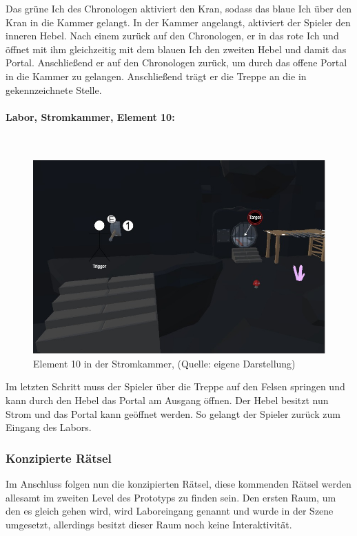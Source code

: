 Das grüne Ich des Chronologen aktiviert den Kran, sodass das blaue Ich über den Kran in die Kammer gelangt. In der Kammer angelangt, aktiviert der Spieler den inneren Hebel. Nach einem  zurück auf den Chronologen,  er in das rote Ich und öffnet mit ihm gleichzeitig mit dem blauen Ich den zweiten Hebel und damit das Portal. Anschließend  er auf den Chronologen zurück, um durch das offene Portal in die Kammer zu gelangen. Anschließend trägt er die Treppe an die in  gekennzeichnete Stelle.
\newpage
\paragraph{Labor, Stromkammer, Element 10:}\label{p:lse10}
~
\begin{figure}[ht]
\centering
\includegraphics[width=1\linewidth]{content/pictures/Raetsel-L02_R01_R09.jpg}
\caption{Element 10 in der Stromkammer, (Quelle: eigene Darstellung)}
\label{fig:L02_R01_R09}
\end{figure}

Im letzten Schritt muss der Spieler über die Treppe auf den Felsen springen und kann durch den Hebel das Portal am Ausgang öffnen. Der Hebel besitzt nun Strom und das Portal kann geöffnet werden. So gelangt der Spieler zurück zum Eingang des Labors.

\subsubsection{Konzipierte Rätsel}

Im Anschluss folgen nun die konzipierten Rätsel, diese kommenden Rätsel werden allesamt im zweiten Level des Prototyps zu finden sein. Den ersten Raum, um den es gleich gehen wird, wird Laboreingang genannt und wurde in der Szene umgesetzt, allerdings besitzt dieser Raum noch keine  Interaktivität.

